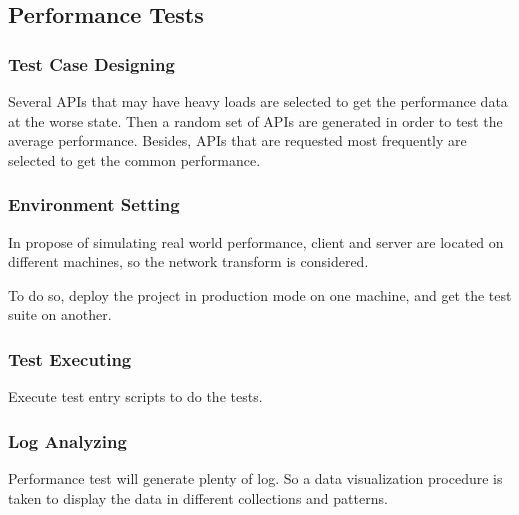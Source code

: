 \subsection{Performance Tests}
\subsubsection{Test Case Designing}
Several APIs that may have heavy loads are selected to get the performance data at the worse state.
Then a random set of APIs are generated in order to test the average performance.
Besides, APIs that are requested most frequently are selected to get the common performance.
\subsubsection{Environment Setting}
In propose of simulating real world performance,
client and server are located on different machines, so the network transform is considered.

To do so, deploy the project in production mode on one machine, and get the test suite on another.
\subsubsection{Test Executing}
Execute test entry scripts to do the tests.
\subsubsection{Log Analyzing}
Performance test will generate plenty of log.
So a data visualization procedure is taken to display the data in different collections and patterns.
